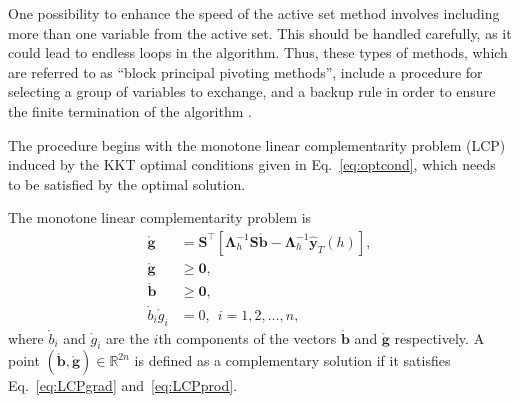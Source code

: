 \documentclass[11pt]{article}
\newcommand{\0}{\phantom{0}}
\begin{document}

One possibility to enhance the speed of the active set method involves including more than one variable from the active set. This should be handled carefully, as it could lead to endless loops in the algorithm. Thus, these types of methods, which are referred to  as ``block principal pivoting methods'', include a procedure for selecting a group of variables to exchange, and a backup rule in order to ensure the finite termination of the algorithm \citep{Judice1994}.

The procedure begins with the monotone linear complementarity problem (LCP) induced by the KKT optimal conditions given in Eq.~\eqref{eq:optcond}, which needs to be satisfied by the optimal solution.

The monotone linear complementarity problem is
\begin{align}
	\mathring{\bm{g}}            & = \bm{S}^\top[\bm{\Lambda}_{h}^{-1}\bm{S}\mathring{\bm{b}} - \bm{\Lambda}_{h}^{-1}\hat{\bm{y}}_{T}(h)],\label{eq:LCPgrad} \\
	\mathring{\bm{g}}            & \geq \bm{0}, \label{eq:LCPg}                                                                                          \\
	\mathring{\bm{b}}            & \geq \bm{0}, \label{eq:LCPb}                                                                                          \\
	\mathring{b}_{i}\mathring{g}_{i} & = 0, \ \ i = 1, 2, \dots, n\label{eq:LCPprod},
\end{align}
where $\mathring{b}_{i}$ and $\mathring{g}_{i}$ are the $i$th components of the vectors $\mathring{\bm{b}}$ and $\mathring{\bm{g}}$ respectively. A point $(\mathring{\bm{b}}, \mathring{\bm{g}}) \in \mathbb{R}^{2n}$ is defined as a complementary solution if it satisfies Eq.~\eqref{eq:LCPgrad} and~\eqref{eq:LCPprod}.
\end{document}
